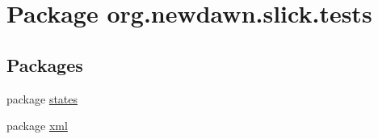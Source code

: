 \hypertarget{namespaceorg_1_1newdawn_1_1slick_1_1tests}{}\section{Package org.\+newdawn.\+slick.\+tests}
\label{namespaceorg_1_1newdawn_1_1slick_1_1tests}
\subsection*{Packages}
\begin{DoxyCompactItemize}
\item 
package \mbox{\hyperlink{namespaceorg_1_1newdawn_1_1slick_1_1tests_1_1states}{states}}
\item 
package \mbox{\hyperlink{namespaceorg_1_1newdawn_1_1slick_1_1tests_1_1xml}{xml}}
\end{DoxyCompactItemize}
